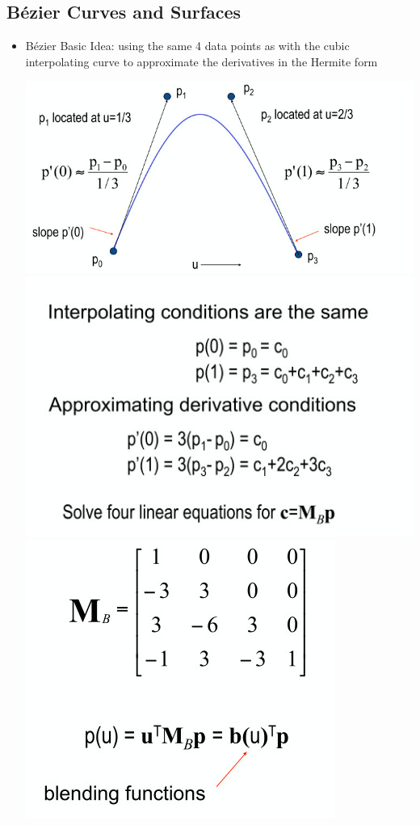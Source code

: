 \documentclass[11pt,a4paper]{article}
\begin{document}
	\subsection{Bézier Curves and Surfaces}
	\begin{itemize}
		\item Bézier Basic Idea: using the same 4 data points as with the cubic interpolating curve to approximate the derivatives in the Hermite form
		\begin{center}
			\includegraphics[scale=0.5]{pictures/bezieridea.jpg} \\
			\includegraphics[scale=0.5]{pictures/bezierequations.jpg} \\
			\includegraphics[scale=0.5]{pictures/beziermatrix.jpg} \\

\end{center}
\end{itemize}
\end{document}
